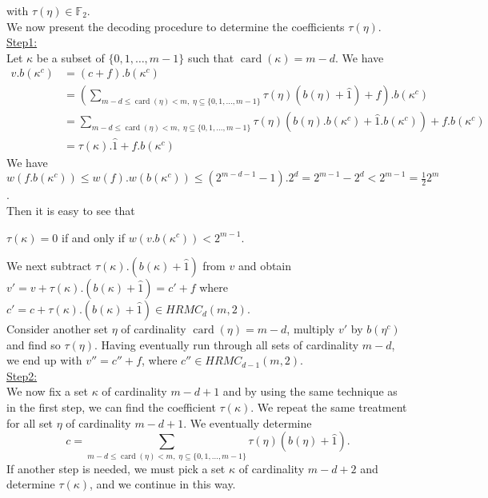 \documentclass{article}
\theoremstyle{plain}
\theoremstyle{definition}
\DeclareMathOperator{\card}{card}
\begin{document}
with $\tau(\eta)\in \mathbb{F}_{2}$.\\
We now present the decoding procedure to determine the coefficients $\tau(\eta)$.
\underline{Step1:}\\
Let $\kappa$ be a subset of $\{0,1,\ldots,m-1\}$ such that $\card(\kappa)=m-d$. We have
\begin{equation*}
\begin{aligned}
v.b(\kappa^c)&=(c+f).b(\kappa^c)\\
&=(\sum_{m-d\leq\card(\eta)<m,\; \eta\subseteq \{0,1,\ldots,m-1\}}\tau(\eta)(b(\eta)+\hat{1})+f).b(\kappa^c)\\
&=\sum_{m-d\leq\card(\eta)<m,\; \eta\subseteq \{0,1,\ldots,m-1\}}\tau(\eta)(b(\eta).b(\kappa^c)+\hat{1}.b(\kappa^c))+f.b(\kappa^c)\\
&=\tau(\kappa).\hat{1}+f.b(\kappa^c)
\end{aligned}
\end{equation*}
We have
$w(f.b(\kappa^c))\leq w(f).w(b(\kappa^c))\leq (2^{m-d-1}-1).2^d=2^{m-1}-2^d<2^{m-1}=\frac{1}{2}2^m$.\\
Then it is easy to see that
\begin{center}
$\tau(\kappa)=0$ if and only if $w(v.b(\kappa^c))<2^{m-1}$.
\end{center}
We next subtract $\tau(\kappa).(b(\kappa)+\hat{1})$ from $v$ and obtain $v'=v+\tau(\kappa).(b(\kappa)+\hat{1})=c'+f$ where $c'=c+\tau(\kappa).(b(\kappa)+\hat{1}) \in HRMC_{d}(m,2)$.\\
Consider another set $\eta$ of cardinality $\card(\eta)=m-d$, multiply $v'$ by $b(\eta^c)$ and find so $\tau(\eta)$. Having eventually run through all sets of cardinality $m-d$, we end up with $v''=c''+f$, where $c''\in HRMC_{d-1}(m,2)$.\\
\underline{Step2:}\\
We now fix a set $\kappa$ of cardinality $m-d+1$ and by using the same technique as in the first step, we can find the coefficient $\tau(\kappa)$. We repeat the same treatment for all set $\eta$ of cardinality $m-d+1$. We eventually determine
\begin{equation*}
c=\sum_{m-d\leq\card(\eta)<m,\; \eta\subseteq \{0,1,\ldots,m-1\}}\tau(\eta)(b(\eta)+\hat{1}).
\end{equation*}
If another step is needed, we must pick a set $\kappa$ of cardinality $m-d+2$ and determine $\tau(\kappa)$, and we continue in this way.
\end{document}
